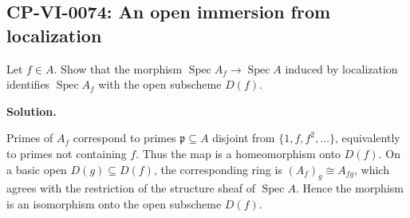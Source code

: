 
\subsection*{CP-VI-0074: An open immersion from localization}

Let $f\in A$. Show that the morphism $\operatorname{Spec}A_f\to\operatorname{Spec}A$ induced by localization identifies $\operatorname{Spec}A_f$ with the open subscheme $D(f)$.

\medskip
\noindent\textbf{Solution.}

Primes of $A_f$ correspond to primes $\mathfrak p\subseteq A$ disjoint from $\{1,f,f^2,\dots\}$, equivalently to primes not containing $f$. Thus the map is a homeomorphism onto $D(f)$. On a basic open $D(g)\subseteq D(f)$, the corresponding ring is $(A_f)_g\cong A_{fg}$, which agrees with the restriction of the structure sheaf of $\operatorname{Spec}A$. Hence the morphism is an isomorphism onto the open subscheme $D(f)$.
